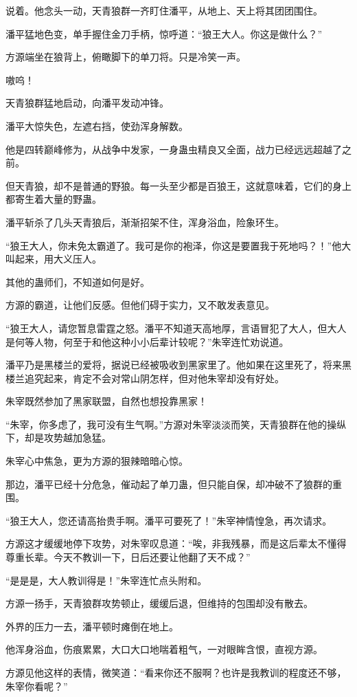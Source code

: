 \begin{this_body}
说着。他念头一动，天青狼群一齐盯住潘平，从地上、天上将其团团围住。

潘平猛地色变，单手握住金刀手柄，惊呼道：“狼王大人。你这是做什么？”

方源端坐在狼背上，俯瞰脚下的单刀将。只是冷笑一声。

嗷呜！

天青狼群猛地启动，向潘平发动冲锋。

潘平大惊失色，左遮右挡，使劲浑身解数。

他是四转巅峰修为，从战争中发家，一身蛊虫精良又全面，战力已经远远超越了之前。

但天青狼，却不是普通的野狼。每一头至少都是百狼王，这就意味着，它们的身上都寄生着大量的野蛊。

潘平斩杀了几头天青狼后，渐渐招架不住，浑身浴血，险象环生。

“狼王大人，你未免太霸道了。我可是你的袍泽，你这是要置我于死地吗？！”他大叫起来，用大义压人。

其他的蛊师们，不知道如何是好。

方源的霸道，让他们反感。但他们碍于实力，又不敢发表意见。

“狼王大人，请您暂息雷霆之怒。潘平不知道天高地厚，言语冒犯了大人，但大人是何等人物，何至于和他这种小小后辈计较呢？”朱宰连忙劝说道。

潘平乃是黑楼兰的爱将，据说已经被吸收到黑家里了。他如果在这里死了，将来黑楼兰追究起来，肯定不会对常山阴怎样，但对他朱宰却没有好处。

朱宰既然参加了黑家联盟，自然也想投靠黑家！

“朱宰，你多虑了，我可没有生气啊。”方源对朱宰淡淡而笑，天青狼群在他的操纵下，却是攻势越加急猛。

朱宰心中焦急，更为方源的狠辣暗暗心惊。

那边，潘平已经十分危急，催动起了单刀蛊，但只能自保，却冲破不了狼群的重围。

“狼王大人，您还请高抬贵手啊。潘平可要死了！”朱宰神情惶急，再次请求。

方源这才缓缓地停下攻势，对朱宰叹息道：“唉，非我残暴，而是这后辈太不懂得尊重长辈。今天不教训一下，日后还要让他翻了天不成？”

“是是是，大人教训得是！”朱宰连忙点头附和。

方源一扬手，天青狼群攻势顿止，缓缓后退，但维持的包围却没有散去。

外界的压力一去，潘平顿时瘫倒在地上。

他浑身浴血，伤痕累累，大口大口地喘着粗气，一对眼眸含恨，直视方源。

方源见他这样的表情，微笑道：“看来你还不服啊？也许是我教训的程度还不够，朱宰你看呢？”


\end{this_body}
